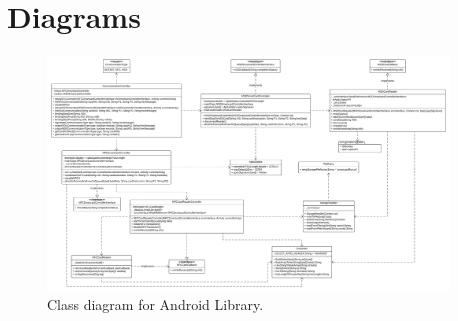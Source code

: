 \chapter{Diagrams}
\label{app:c}

\begin{figure}[h!]
  \caption{Class diagram for Android Library.}
  \label{fig:classdiagram_extended}
  \centering
    \includegraphics[width=0.95\textwidth]{images/Class_Diagram_Extended_Desc.png}
\end{figure}
